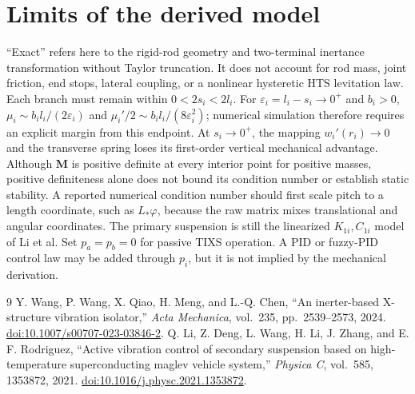 \documentclass[a4paper,12pt]{article}
\numberwithin{equation}{section}
\newcommand{\vect}[1]{\boldsymbol{#1}}
\begin{document}
\section{Limits of the derived model}
``Exact'' refers here to the rigid-rod geometry and two-terminal inertance transformation without Taylor truncation. It does not account for rod mass, joint friction, end stops, lateral coupling, or a nonlinear hysteretic HTS levitation law. Each branch must remain within $0<2s_i<2l_i$. For $\varepsilon_i=l_i-s_i\to0^+$ and $b_i>0$, $\mu_i\sim b_i l_i/(2\varepsilon_i)$ and $\mu_i'/2\sim b_i l_i/(8\varepsilon_i^2)$; numerical simulation therefore requires an explicit margin from this endpoint. At $s_i\to0^+$, the mapping $w_i'(r_i)\to0$ and the transverse spring loses its first-order vertical mechanical advantage. Although $\vect M$ is positive definite at every interior point for positive masses, positive definiteness alone does not bound its condition number or establish static stability. A reported numerical condition number should first scale pitch to a length coordinate, such as $L_*\varphi$, because the raw matrix mixes translational and angular coordinates. The primary suspension is still the linearized $K_{1i},C_{1i}$ model of Li et al. Set $p_a=p_b=0$ for passive TIXS operation. A PID or fuzzy-PID control law may be added through $p_i$, but it is not implied by the mechanical derivation.

\begin{thebibliography}{9}
 Y. Wang, P. Wang, X. Qiao, H. Meng, and L.-Q. Chen, ``An inerter-based X-structure vibration isolator,'' \emph{Acta Mechanica}, vol.~235, pp.~2539--2573, 2024. \href{https://doi.org/10.1007/s00707-023-03846-2}{doi:10.1007/s00707-023-03846-2}.
 Q. Li, Z. Deng, L. Wang, H. Li, J. Zhang, and E. F. Rodriguez, ``Active vibration control of secondary suspension based on high-temperature superconducting maglev vehicle system,'' \emph{Physica C}, vol.~585, 1353872, 2021. \href{https://doi.org/10.1016/j.physc.2021.1353872}{doi:10.1016/j.physc.2021.1353872}.
\end{thebibliography}
\end{document}
